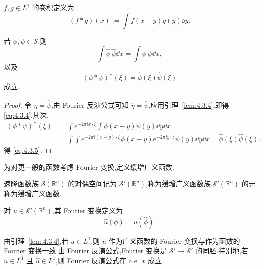 $f, g \in L^{1}$ 的卷积定义为
\begin{equation*}
(f * g)(x) := \int f(x - y)g(y)\dd y.
\end{equation*}

\begin{theorem}\label{thm:4.3.6}
若 $\phi, \psi \in \mathcal{S}$,则
\begin{equation}
\int\hat{\phi}\,\overline{\widehat{\psi}}\dd x = \int\phi\,\overline{\psi}\dd x,\tag{4.3.4}
\label{eq:4.3.4}\end{equation}
以及
\begin{equation}
(\phi * \psi)^{\wedge}(\xi) = \hat{\phi}(\xi)\hat{\psi}(\xi)\tag{4.3.5}
\label{eq:4.3.5}\end{equation}
成立.
\end{theorem}

\begin{proof}
令 $\eta = \overline{\hat{\psi}}$,由 Fourier 反演公式可知 $\hat{\eta} = \overline{\psi}$.应用引理~\ref{lem:4.3.4},即得 \eqref{eq:4.3.4}.其次,
\begin{equation}
\begin{aligned}
(\phi * \psi)^{\wedge}(\xi) & = \int e^{-2\pi i x\cdot\xi}\int\phi(x - y)\psi(y)\dd y\dd x \\
& = \int\int e^{-2\pi i (x - y)\cdot\xi}\phi(x - y)e^{-2\pi i y\cdot\xi}\psi(y)\dd y\dd x = \hat{\phi}(\xi)\hat{\psi}(\xi).
\end{aligned}
\end{equation}
得 \eqref{eq:4.3.5}.
\end{proof}

为对更一般的函数考虑 Fourier 变换,定义缓增广义函数.

\begin{definition}[缓增广义函数]\label{def:4.3.7}
速降函数族 $\mathcal{S}(\mathbb{R}^{n})$ 的对偶空间记为 $\mathcal{S}'(\mathbb{R}^{n})$,称为缓增广义函数族.$\mathcal{S}'(\mathbb{R}^{n})$ 的元称为缓增广义函数.
\end{definition}

\begin{definition}\label{def:4.3.8}
对 $u \in \mathcal{S}'(\mathbb{R}^{n})$,其 Fourier 变换定义为
\begin{equation*}
\hat{u}(\phi) = u(\hat{\phi}).
\end{equation*}
\end{definition}

由引理~\ref{lem:4.3.4},若 $u \in L^{1}$,则 $u$ 作为广义函数的 Fourier 变换与作为函数的 Fourier 变换一致.由 Fourier 反演公式,Fourier 变换是 $\mathcal{S}' \to \mathcal{S}'$ 的同胚.特别地,若 $u \in L^{1}$ 且 $\hat{u} \in L^{1}$,则 Fourier 反演公式在 a.e. $x$ 成立.

